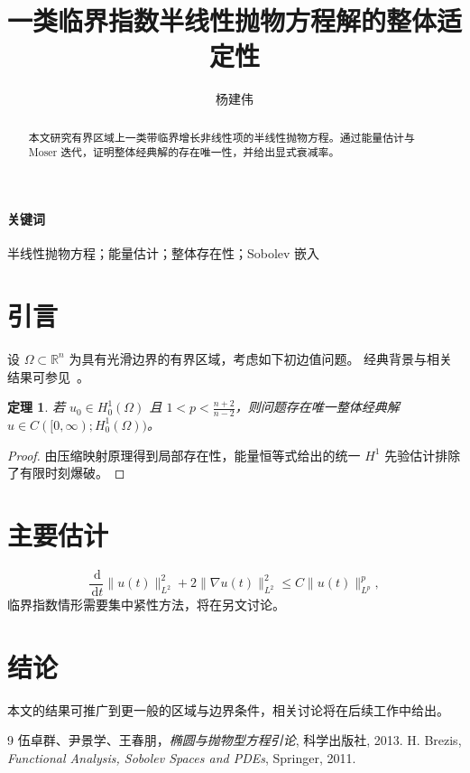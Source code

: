 \documentclass[UTF8,fontset=fandol,11pt]{ctexart}
\title{一类临界指数半线性抛物方程解的整体适定性}
\author{杨建伟}
\date{}
\newtheorem{theorem}{定理}[section]
\newcommand{\R}{\mathbb{R}}
\newcommand{\Om}{\Omega}
\newcommand{\dd}{\,\mathrm{d}}
\begin{document}
\maketitle
\begin{abstract}
本文研究有界区域上一类带临界增长非线性项的半线性抛物方程。通过能量估计与 Moser 迭代，证明整体经典解的存在唯一性，并给出显式衰减率。
\end{abstract}
\paragraph{关键词} 半线性抛物方程；能量估计；整体存在性；Sobolev 嵌入

\section{引言}
设 $\Om\subset\R^n$ 为具有光滑边界的有界区域，考虑如下初边值问题。
经典背景与相关结果可参见~\cite{Evans,Brezis}。

\begin{theorem}
若 $u_0\in H^1_0(\Om)$ 且 $1<p<\frac{n+2}{n-2}$，则问题存在唯一整体经典解 $u\in C([0,\infty);H^1_0(\Om))$。
\end{theorem}

\begin{proof}
由压缩映射原理得到局部存在性，能量恒等式给出的统一 $H^1$ 先验估计排除了有限时刻爆破。
\end{proof}

\section{主要估计}
\begin{equation}
\frac{\dd}{\dd t}\|u(t)\|_{L^2}^2+2\|\nabla u(t)\|_{L^2}^2\le C\|u(t)\|_{L^p}^{p},
\end{equation}
临界指数情形需要集中紧性方法，将在另文讨论。

\section{结论}
本文的结果可推广到更一般的区域与边界条件，相关讨论将在后续工作中给出。

\begin{thebibliography}{9}
 伍卓群、尹景学、王春朋，\emph{椭圆与抛物型方程引论}, 科学出版社, 2013.
 H. Brezis, \emph{Functional Analysis, Sobolev Spaces and PDEs}, Springer, 2011.
\end{thebibliography}
\end{document}
